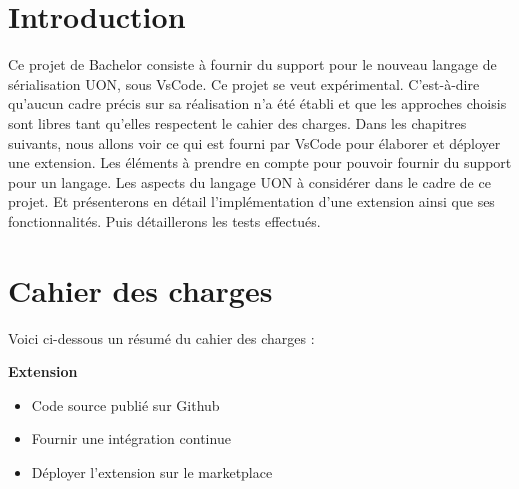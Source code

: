 \documentclass[
    iict, %
    il, %
]{heig-tb}
\begin{document}
\maketitle
\frontmatter
\clearemptydoublepage

\preamble
\let\cleardoublepage\clearpage
\authentification
\let\cleardoublepage\clearpage

\begin{abstract}
    
\end{abstract}

\clearemptydoublepage
{
    \tableofcontents
    \let\cleardoublepage\clearpage
    \listoffigures
    \let\cleardoublepage\clearpage
    \listoftables
    \let\cleardoublepage\clearpage
    \listoflistings
}

\printnomenclature
\clearemptydoublepage
{}


\mainmatter
\chapter{Introduction}
Ce projet de Bachelor consiste à fournir du support pour le nouveau langage de sérialisation UON, sous VsCode. Ce projet se veut expérimental. C’est-à-dire qu’aucun cadre précis sur sa réalisation n’a été établi et que les approches choisis sont libres tant qu’elles respectent le cahier des charges.
Dans les chapitres suivants, nous allons voir ce qui est fourni par VsCode pour élaborer et déployer une extension.
Les éléments à prendre en compte pour pouvoir fournir du support pour un langage.
Les aspects du langage UON à considérer dans le cadre de ce projet.
Et présenterons en détail l’implémentation d’une extension ainsi que ses fonctionnalités. Puis détaillerons les tests effectués.

\let\cleardoublepage\clearpage

\chapter{Cahier des charges}
Voici ci-dessous un résumé du cahier des charges :

\textbf{Extension}
\begin{itemize}
    \item Code source publié sur Github
    \item Fournir une intégration continue
    \item Déployer l'extension sur le marketplace
\end{itemize}
\end{document}
